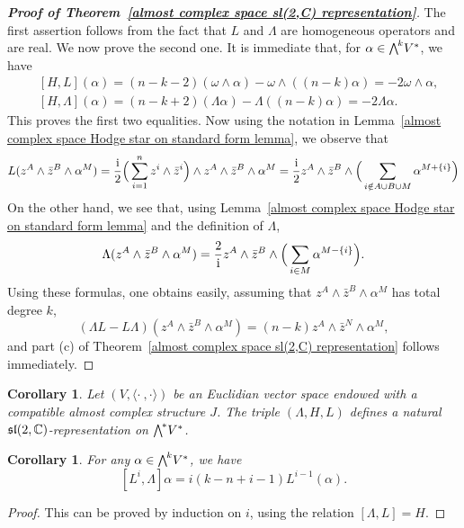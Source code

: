 \documentclass[11pt]{book}
\newtheorem{corollary}[theorem]{Corollary}
\theoremstyle{definition}
\begin{document}
\begin{proof}[\textbf{Proof of Theorem~\ref{almost complex space sl(2,C) representation}}]
The first assertion follows from the fact that $L$ and $\Lambda$ are homogeneous operators and are real. We now prove the second one. It is immediate that, for $\alpha\in\bigw^kV^*$, we have
\begin{align*}
&[H,L](\alpha)=(n-k-2)(\omega\wedge\alpha)-\omega\wedge((n-k)\alpha)=-2\omega\wedge\alpha,\\
&[H,\Lambda](\alpha)=(n-k+2)(\Lambda\alpha)-\Lambda((n-k)\alpha)=-2\Lambda\alpha.
\end{align*}
This proves the first two equalities. Now using the notation in Lemma~\ref{almost complex space Hodge star on standard form lemma}, we observe that
\begin{align*}
L(z^A\wedge\bar{z}^B\wedge\alpha^M)=\frac{\mathrm{i}}{2}\Big(\sum_{i=1}^{n}z^i\wedge\bar{z}^i\Big)\wedge z^A\wedge\bar{z}^B\wedge\alpha^M=\frac{\mathrm{i}}{2}z^A\wedge\bar{z}^B\wedge\Big(\sum_{i\notin A\cup B\cup M}\alpha^{M+\{i\}}\Big)
\end{align*}
On the other hand, we see that, using Lemma~\ref{almost complex space Hodge star on standard form lemma} and the definition of $\Lambda$,
\begin{align*}
\Lambda(z^A\wedge\bar{z}^B\wedge\alpha^M)=\frac{2}{\mathrm{i}}z^A\wedge\bar{z}^B\wedge\Big(\sum_{i\in M}\alpha^{M-\{i\}}\Big).
\end{align*}
Using these formulas, one obtains easily, assuming that $z^A\wedge\bar{z}^B\wedge\alpha^M$ has total degree $k$,
\[(\Lambda L-L\Lambda)(z^A\wedge\bar{z}^B\wedge\alpha^M)=(n-k)z^A\wedge\bar{z}^N\wedge\alpha^M,\]
and part (c) of Theorem~\ref{almost complex space sl(2,C) representation} follows immediately.
\end{proof}
\begin{corollary}
Let $(V,\langle\cdot\ ,\cdot\rangle)$ be an Euclidian vector space endowed with a compatible almost complex structure $J$. The triple $(\Lambda,H,L)$ defines a natural $\mathfrak{sl}(2,\mathbb{C})$-representation on $\bigw^*V^*$.
\end{corollary}
\begin{corollary}\label{almost complex space Lefschetz commutator with dual}
For any $\alpha\in\bigw^kV^*$, we have
\[[L^i,\Lambda]\alpha=i(k-n+i-1)L^{i-1}(\alpha).\]
\end{corollary}
\begin{proof}
This can be proved by induction on $i$, using the relation $[\Lambda,L]=H$.
\end{proof}
\end{document}
